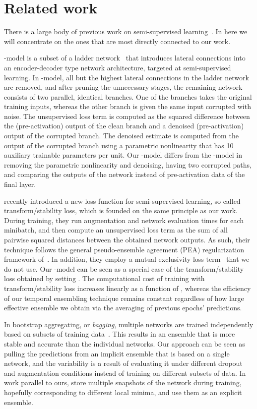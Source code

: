 \documentclass{article}
\begin{document}
\section{Related work}
\label{sec:related}

There is a large body of previous work on semi-supervised learning~\citep{zhu05survey}. 
In here we will concentrate on the ones that are most directly connected to our work.

-model is a subset of a ladder network~\citep{ladder} that introduces lateral connections
into an encoder-decoder type network architecture, targeted at semi-supervised
learning. In -model, all but the highest lateral connections in the ladder
network are removed, and after pruning the unnecessary stages, the remaining network
consists of two parallel, identical branches. One of the branches takes the original
training inputs, whereas the other branch is given the same input corrupted with noise.
The unsupervised loss term is computed as the squared difference between the (pre-activation) output of the clean branch and a denoised (pre-activation) output of the corrupted branch. The denoised estimate is computed from the output of the corrupted branch using a parametric nonlinearity that has 10 auxiliary trainable parameters per unit.
Our -model differs
from the -model in removing the parametric nonlinearity and denoising, having two corrupted paths, and comparing the outputs of
the network instead of pre-activation data of the final layer.

\cite{sajjadi16} recently introduced a new loss function for semi-supervised learning, so
called transform/stability loss, which is founded on the same principle as our work.
During training, they run augmentation and network evaluation  times for each
minibatch, and then compute an unsupervised loss term as the sum of all pairwise squared distances between
the obtained  network outputs. 
As such, their technique follows the general pseudo-ensemble agreement (PEA) regularization framework of~\cite{PseudoEnsembles}.
In addition, they employ a mutual exclusivity loss term~\citep{meloss} that we do not use. Our -model can be seen as a special case of the 
transform/stability loss obtained by setting \mbox{}. The computational cost of
training with transform/stability loss increases linearly as a function of , whereas
the efficiency of our temporal ensembling technique remains constant regardless of how large
effective ensemble we obtain via the averaging of previous epochs' predictions.

In bootstrap aggregating, or {\em bagging}, multiple networks are trained independently
based on subsets of training data~\citep{breiman96}. This results in an ensemble that is more stable
and accurate than the individual networks. Our approach can be seen as pulling the predictions from an
implicit ensemble that is based on a single network, and the variability is a result of evaluating it under
different dropout and augmentation conditions instead of training on different subsets of data.
In work parallel to ours, \cite{Snapshot2017} store multiple snapshots of the network during training, hopefully corresponding to different local minima, and use them as an explicit ensemble.
\end{document}
